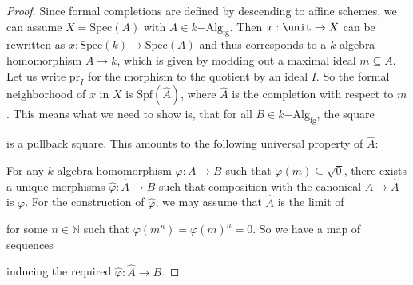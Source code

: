 \documentclass{msc}
\newcommand{\bN}{\mathbb N}
\newcommand{\Spec}{\ensuremath{\mathrm{Spec}}}
\newcommand{\Spf}{\ensuremath{\mathrm{Spf}}}
\newcommand{\fgkAlg}{\ensuremath{k\mathrm{-Alg}_{\mathrm{fg}}}}
\newcommand{\fgkAlgTop}{\ensuremath{k\mathrm{-Alg}_{\mathrm{fg,top}}}}
\begin{document}
\begin{proof}
  Since formal completions are defined by descending to affine schemes, we can assume $X=\Spec(A)$ with $A\in\fgkAlg$.
  Then $x:\unit\to X$ can be rewritten as $x:\Spec(k)\to\Spec(A)$ and thus corresponds to a $k$-algebra homomorphism $A\to k$,
  which is given by modding out a maximal ideal $m\subseteq A$. Let us write $\mathrm{pr}_I$ for the morphism to the quotient by an ideal $I$.
  So the formal neighborhood of $x$ in $X$ is $\Spf(\hat{A})$, where $\hat{A}$ is the completion with respect to $m$.
  This means what we need to show is, that for all $B\in\fgkAlg$, the square
  \begin{center}
  \end{center}
  is a pullback square. This amounts to the following universal property of $\hat{A}$:

  For any $k$-algebra homomorphism $\varphi:A\to B$ such that $\varphi(m)\subseteq \sqrt{0}$, there exists a unique morphisms
  $\hat{\varphi}:\hat{A}\to B$ such that composition with the canonical $A\to\hat{A}$ is $\varphi$.
  For the construction of $\hat{\varphi}$, we may assume that $\hat{A}$ is the limit of
  \begin{center}
  \end{center}
  for some $n\in\bN$ such that $\varphi(m^n)=\varphi(m)^n={0}$. So we have a map of sequences
  \begin{center}
  \end{center}
  inducing the required $\hat{\varphi}:\hat{A}\to B$.
\end{proof}
\printbibliography
\end{document}
